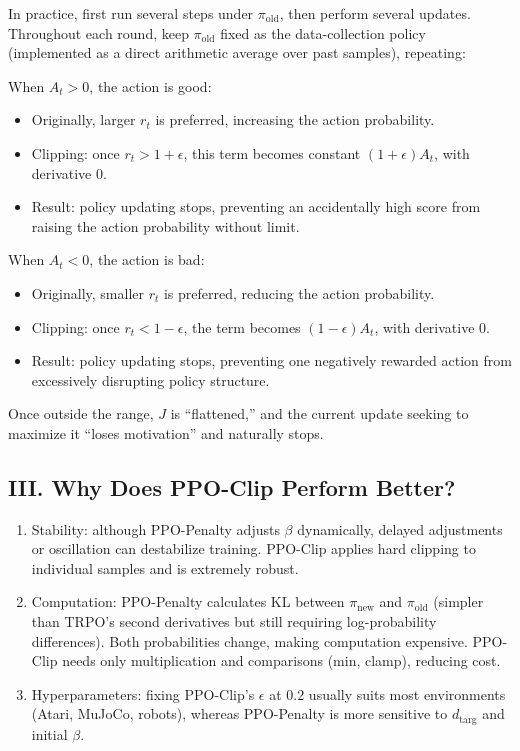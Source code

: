 In practice, first run several steps under \(\pi_{\mathrm{old}}\), then perform several updates. Throughout each round, keep \(\pi_{\mathrm{old}}\) fixed as the data-collection policy (implemented as a direct arithmetic average over past samples), repeating:

When \(A_t>0\), the action is good:

\begin{itemize}
\tightlist
\item
  Originally, larger \(r_t\) is preferred, increasing the action probability.
\item
  Clipping: once \(r_t>1+\epsilon\), this term becomes constant \((1+\epsilon)A_t\), with derivative \(0\).
\item
  Result: policy updating stops, preventing an accidentally high score from raising the action probability without limit.
\end{itemize}

When \(A_t<0\), the action is bad:

\begin{itemize}
\tightlist
\item
  Originally, smaller \(r_t\) is preferred, reducing the action probability.
\item
  Clipping: once \(r_t<1-\epsilon\), the term becomes \((1-\epsilon)A_t\), with derivative \(0\).
\item
  Result: policy updating stops, preventing one negatively rewarded action from excessively disrupting policy structure.
\end{itemize}

Once outside the range, \(J\) is ``flattened,'' and the current update seeking to maximize it ``loses motivation'' and naturally stops.

\hypertarget{iii.-why-does-ppo-clip-perform-better}{%
\subsection{III. Why Does PPO-Clip Perform Better?}\label{iii.-why-does-ppo-clip-perform-better}}

\begin{enumerate}
\def\labelenumi{\arabic{enumi}.}
\item
  Stability: although PPO-Penalty adjusts \(\beta\) dynamically, delayed adjustments or oscillation can destabilize training. PPO-Clip applies hard clipping to individual samples and is extremely robust.
\item
  Computation: PPO-Penalty calculates KL between \(\pi_{\mathrm{new}}\) and \(\pi_{\mathrm{old}}\) (simpler than TRPO's second derivatives but still requiring log-probability differences). Both probabilities change, making computation expensive. PPO-Clip needs only multiplication and comparisons (min, clamp), reducing cost.
\item
  Hyperparameters: fixing PPO-Clip's \(\epsilon\) at \(0.2\) usually suits most environments (Atari, MuJoCo, robots), whereas PPO-Penalty is more sensitive to \(d_{\mathrm{targ}}\) and initial \(\beta\).
\end{enumerate}


